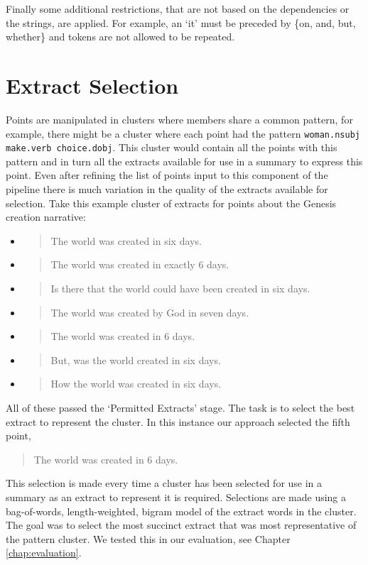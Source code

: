     Finally some additional restrictions, that are not based on the dependencies or the strings, are applied. For example, an `it' must be preceded by \{on, and, but, whether\} and tokens are not allowed to be repeated.

  \section{Extract Selection}
    Points are manipulated in clusters where members share a common pattern, for example, there might be a cluster where each point had the pattern \texttt{woman.nsubj make.verb choice.dobj}. This cluster would contain all the points with this pattern and in turn all the extracts available for use in a summary to express this point. Even after refining the list of points input to this component of the pipeline there is much variation in the quality of the extracts available for selection. Take this example cluster of extracts for points about the Genesis creation narrative:

    \begin{itemize}[label={}]
      \item{\blockquote{The world was created in six days.}}
      \item{\blockquote{The world was created in exactly 6 days.}}
      \item{\blockquote{Is there that the world could have been created in six days.}}
      \item{\blockquote{The world was created by God in seven days.}}
      \item{\blockquote{The world was created in 6 days.}}
      \item{\blockquote{But, was the world created in six days.}}
      \item{\blockquote{How the world was created in six days.}}
    \end{itemize}

    All of these passed the `Permitted Extracts' stage. The task is to select the best extract to represent the cluster. In this instance our approach selected the fifth point, \blockquote{The world was created in 6 days.}. This selection is made every time a cluster has been selected for use in a summary as an extract to represent it is required. Selections are made using a bag-of-words, length-weighted, bigram model of the extract words in the cluster. The goal was to select the most succinct extract that was most representative of the pattern cluster. We tested this in our evaluation, see Chapter \ref{chap:evaluation}.


